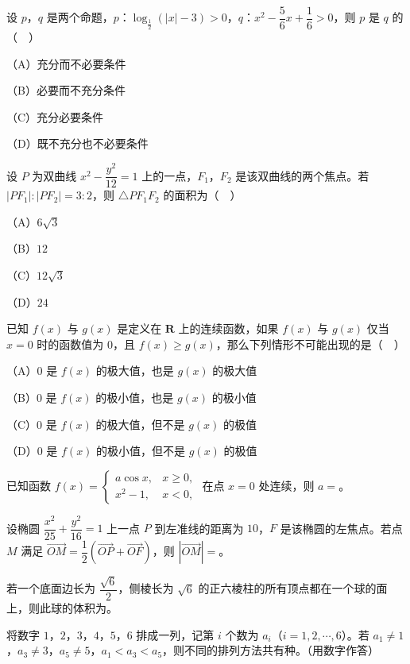\begin{question}
设 $p$，$q$ 是两个命题，$p$：$\log_{\frac12}(|x|-3)>0$，$q$：$x^2-\dfrac56x+\dfrac16>0$，则 $p$ 是 $q$ 的（　）

（A）充分而不必要条件

（B）必要而不充分条件

（C）充分必要条件

（D）既不充分也不必要条件

\end{question}
\begin{question}
设 $P$ 为双曲线 $x^2-\dfrac{y^2}{12}=1$ 上的一点，$F_1$，$F_2$ 是该双曲线的两个焦点。若 $|PF_1|:|PF_2|=3:2$，则 $\triangle PF_1F_2$ 的面积为（　）

（A）$6\sqrt3$

（B）$12$

（C）$12\sqrt3$

（D）$24$

\end{question}
\begin{question}
已知 $f(x)$ 与 $g(x)$ 是定义在 $\mathbf R$ 上的连续函数，如果 $f(x)$ 与 $g(x)$ 仅当 $x=0$ 时的函数值为 $0$，且 $f(x)\geqslant g(x)$，那么下列情形不可能出现的是（　）

（A）$0$ 是 $f(x)$ 的极大值，也是 $g(x)$ 的极大值

（B）$0$ 是 $f(x)$ 的极小值，也是 $g(x)$ 的极小值

（C）$0$ 是 $f(x)$ 的极大值，但不是 $g(x)$ 的极值

（D）$0$ 是 $f(x)$ 的极小值，但不是 $g(x)$ 的极值

\end{question}

\begin{question}
已知函数 $f(x)=\begin{cases}a\cos x,&x\geqslant0,\\ x^2-1,&x<0,\end{cases}$ 在点 $x=0$ 处连续，则 $a=$\gkblank{}。

\end{question}
\begin{question}
设椭圆 $\dfrac{x^2}{25}+\dfrac{y^2}{16}=1$ 上一点 $P$ 到左准线的距离为 $10$，$F$ 是该椭圆的左焦点。若点 $M$ 满足 $\overrightarrow{OM}=\dfrac12\left(\overrightarrow{OP}+\overrightarrow{OF}\right)$，则 $|\overrightarrow{OM}|=$\gkblank{}。

\end{question}
\begin{question}
若一个底面边长为 $\dfrac{\sqrt6}{2}$，侧棱长为 $\sqrt6$ 的正六棱柱的所有顶点都在一个球的面上，则此球的体积为\gkblank{}。

\end{question}
\begin{question}
将数字 $1$，$2$，$3$，$4$，$5$，$6$ 排成一列，记第 $i$ 个数为 $a_i$（$i=1,2,\cdots,6$）。若 $a_1\neq1$，$a_3\neq3$，$a_5\neq5$，$a_1<a_3<a_5$，则不同的排列方法共有\gkblank{}种。（用数字作答）

\end{question}

